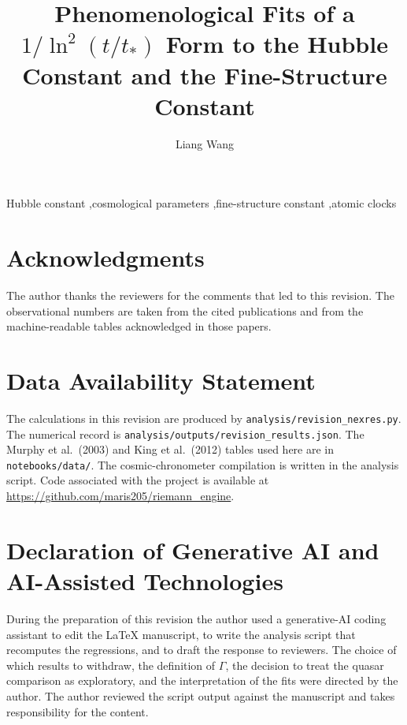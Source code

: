 \documentclass[final,3p,times,twocolumn]{elsarticle}
\begin{document}
\begin{frontmatter}

\title{Phenomenological Fits of a \texorpdfstring{$1/\ln^{2}(t/t_{*})$}{1/ln\textasciicircum2(t/t*)} Form to the Hubble Constant and the Fine-Structure Constant}

\author[hust]{Liang Wang}
\address[hust]{School of Artificial Intelligence and Automation, Huazhong University of Science and Technology, 430070, P.R. China}



\begin{keyword}
Hubble constant \sep cosmological parameters \sep fine-structure constant \sep atomic clocks
\end{keyword}

\end{frontmatter}

\linenumbers









\section*{Acknowledgments}
The author thanks the reviewers for the comments that led to this revision.
The observational numbers are taken from the cited publications and from the machine-readable tables acknowledged in those papers.

\section*{Data Availability Statement}
The calculations in this revision are produced by \texttt{analysis/revision\_nexres.py}.
The numerical record is \texttt{analysis/outputs/revision\_results.json}.
The Murphy et al.\ (2003) and King et al.\ (2012) tables used here are in \texttt{notebooks/data/}.
The cosmic-chronometer compilation is written in the analysis script.
Code associated with the project is available at \url{https://github.com/maris205/riemann_engine}.

\section*{Declaration of Generative AI and AI-Assisted Technologies}
During the preparation of this revision the author used a generative-AI coding assistant to edit the \LaTeX{} manuscript, to write the analysis script that recomputes the regressions, and to draft the response to reviewers.
The choice of which results to withdraw, the definition of $\Gamma$, the decision to treat the quasar comparison as exploratory, and the interpretation of the fits were directed by the author.
The author reviewed the script output against the manuscript and takes responsibility for the content.



\end{document}
